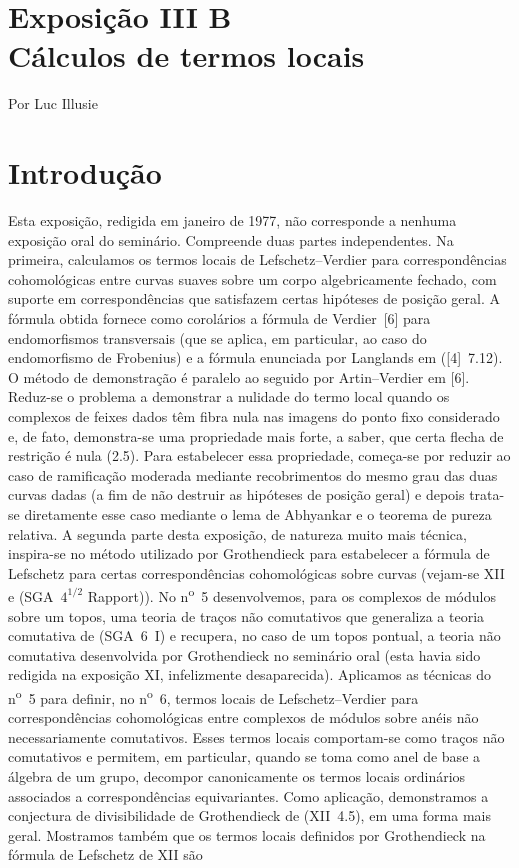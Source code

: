 \section*{Exposição III B\\Cálculos de termos locais}
\begin{center}
Por Luc Illusie
\end{center}

\section*{Introdução}

Esta exposição, redigida em janeiro de 1977, não corresponde a nenhuma exposição oral do seminário. Compreende duas partes independentes. Na primeira, calculamos os termos locais de Lefschetz--Verdier para correspondências cohomológicas entre curvas suaves sobre um corpo algebricamente fechado, com suporte em correspondências que satisfazem certas hipóteses de posição geral. A fórmula obtida fornece como corolários a fórmula de Verdier~[6] para endomorfismos transversais (que se aplica, em particular, ao caso do endomorfismo de Frobenius) e a fórmula enunciada por Langlands em ([4]~7.12). O método de demonstração é paralelo ao seguido por Artin--Verdier em [6]. Reduz-se o problema a demonstrar a nulidade do termo local quando os complexos de feixes dados têm fibra nula nas imagens do ponto fixo considerado e, de fato, demonstra-se uma propriedade mais forte, a saber, que certa flecha de restrição é nula (2.5). Para estabelecer essa propriedade, começa-se por reduzir ao caso de ramificação moderada mediante recobrimentos do mesmo grau das duas curvas dadas (a fim de não destruir as hipóteses de posição geral) e depois trata-se diretamente esse caso mediante o lema de Abhyankar e o teorema de pureza relativa. A segunda parte desta exposição, de natureza muito mais técnica, inspira-se no método utilizado por Grothendieck para estabelecer a fórmula de Lefschetz para certas correspondências cohomológicas sobre curvas (vejam-se XII e (SGA~$4^{1/2}$ Rapport)). No n\textsuperscript{o}~5 desenvolvemos, para os complexos de módulos sobre um topos, uma teoria de traços não comutativos que generaliza a teoria comutativa de (SGA~6~I) e recupera, no caso de um topos pontual, a teoria não comutativa desenvolvida por Grothendieck no seminário oral (esta havia sido redigida na exposição XI, infelizmente desaparecida). Aplicamos as técnicas do n\textsuperscript{o}~5 para definir, no n\textsuperscript{o}~6, termos locais de Lefschetz--Verdier para correspondências cohomológicas entre complexos de módulos sobre anéis não necessariamente comutativos. Esses termos locais comportam-se como traços não comutativos e permitem, em particular, quando se toma como anel de base a álgebra de um grupo, decompor canonicamente os termos locais ordinários associados a correspondências equivariantes. Como aplicação, demonstramos a conjectura de divisibilidade de Grothendieck de (XII~4.5), em uma forma mais geral. Mostramos também que os termos locais definidos por Grothendieck na fórmula de Lefschetz de XII são 